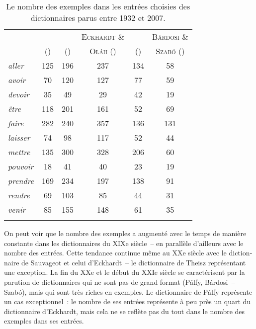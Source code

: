 \documentclass[output=paper,colorlinks,citecolor=brown,arabicfont,chinesefont,booklanguage=french]{langscibook}
\begin{document}
\begin{otherlanguage}{french}
\begin{table}[p]
\small
\caption{Le nombre des exemples dans les entrées choisies des dictionnaires parus entre 1932 et 2007.}
\label{til:tab2}
\begin{tabular}{>{\itshape}l *5{c}}
\lsptoprule
 & \citeauthor{Sauvageot1932} & \citeauthor{Eckhardt1953} &  \textsc{Eckhardt} \&                        & \citeauthor{Palfy1999} &  \textsc{Bárdosi} \& \\
 & (\citeyear{Sauvageot1932}) & (\citeyear{Eckhardt1953}) &  \textsc{Oláh} (\citeyear{EckhardtOlah1999}) & (\citeyear{Palfy1999}) &  \textsc{Szabó} (\citeyear{BardosiSzabo2007}) \\
\midrule
aller & 125 & 196 & 237 & 134 & 58 \\
avoir & 70 & 120 & 127 & 77 & 59 \\
devoir & 35 & 49 & 29 & 42 & 19 \\
être & 118 & 201 & 161 & 52 & 69 \\
faire & 282 & 240 & 357 & 136 & 131 \\
laisser & 74 & 98 & 117 & 52 & 44 \\
mettre & 135 & 300 & 328 & 206 & 60 \\
pouvoir & 18 & 41 & 40 & 23 & 19 \\
prendre & 169 & 234 & 197 & 138 & 91 \\
rendre & 69 & 103 & 85 & 44 & 31 \\
venir & 85 & 155 & 148 & 61 & 35 \\
\lspbottomrule
\end{tabular}
\end{table}

On peut voir que le nombre des exemples a augmenté avec le temps de manière constante dans les dictionnaires du XIXe siècle~-- en parallèle d’ailleurs avec le nombre des entrées. Cette tendance continue même au XXe siècle avec le dictionnaire de Sauvageot et celui d’Eckhardt~-- le dictionnaire de Theisz représentant une exception. La fin du XXe et le début du XXIe siècle se caractérisent par la parution de dictionnaires qui ne sont pas de grand format (Pálfy, Bárdosi~-- Szabó), mais qui sont très riches en exemples. Le dictionnaire de Pálfy représente un cas exceptionnel~: le nombre de ses entrées représente à peu près un quart du dictionnaire d’Eckhardt, mais cela ne se reflète pas du tout dans le nombre des exemples dans ses entrées.


\end{otherlanguage}
\end{document}
